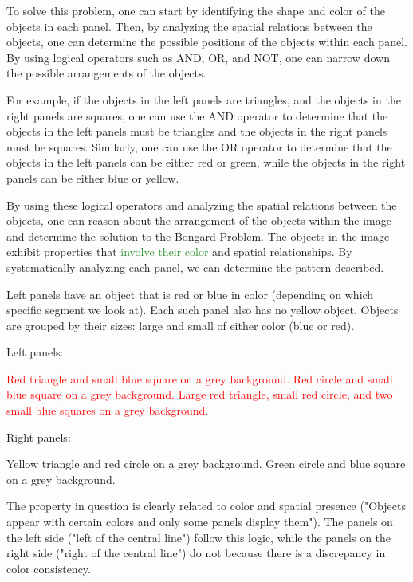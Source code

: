 \begin{tcolorbox}[breakable,enhanced jigsaw,opacityback=0,]
\begin{dialogue}
		To solve this problem, one can start by identifying the shape and color of the objects in each panel. Then, by analyzing the spatial relations between the objects, one can determine the possible positions of the objects within each panel. By using logical operators such as AND, OR, and NOT, one can narrow down the possible arrangements of the objects.
		
		For example, if the objects in the left panels are triangles, and the objects in the right panels are squares, one can use the AND operator to determine that the objects in the left panels must be triangles and the objects in the right panels must be squares. Similarly, one can use the OR operator to determine that the objects in the left panels can be either red or green, while the objects in the right panels can be either blue or yellow.
		
		By using these logical operators and analyzing the spatial relations between the objects, one can reason about the arrangement of the objects within the image and determine the solution to the Bongard Problem.
		\vspace{1em}
		 The objects in the image exhibit properties that \textcolor{ForestGreen}{involve their color} and spatial relationships. By systematically analyzing each panel, we can determine the pattern described.
		
		Left panels have an object that is red or blue in color (depending on which specific segment we look at).
		Each such panel also has no yellow object.
		Objects are grouped by their sizes: large and small of either color (blue or red).
		
		Left panels:
		
		\textcolor{red}{Red triangle and small blue square on a grey background.
			Red circle and small blue square on a grey background.
			Large red triangle, small red circle, and two small blue squares on a grey background}.
		
		Right panels:
		
		Yellow triangle and red circle on a grey background.
		Green circle and blue square on a grey background.
		
		The property in question is clearly related to color and spatial presence ("Objects appear with certain colors and only some panels display them"). The panels on the left side ("left of the central line") follow this logic, while the panels on the right side ("right of the central line") do not because there is a discrepancy in color consistency.
		

\end{dialogue}
\end{tcolorbox}

